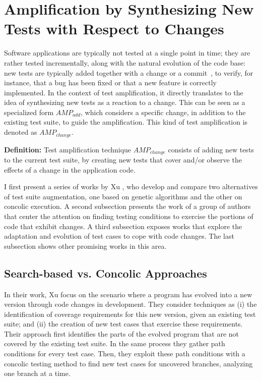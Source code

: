 \section{Amplification by Synthesizing New Tests with Respect to Changes}
\label{sec:sota:category-2}

Software applications are typically not tested at a single point in time; they are rather tested incrementally, along with the natural evolution of the code base: 
new tests are typically added together with a change or a commit~\cite{azaidmanEMSE2011,DBLP:conf/icst/ZaidmanRDD08}, to verify, for instance, that a bug has been fixed or that a new feature is correctly implemented. 
In the context of test amplification, it directly translates to the idea of synthesizing new tests as a reaction to a change. 
This can be seen as a specialized form $AMP_{add}$, which considers a specific change, in addition to the existing test suite, to guide the amplification.
This kind of test amplification is denoted as $AMP_{change}$. 

\medskip
\begin{mdframed}
\textbf{Definition:} Test amplification technique $AMP_{change}$ consists of adding new tests to the current test suite, by creating new tests that cover and/or observe the effects of a change in the application code.
\end{mdframed}

I first present a series of works by Xu \etal, who develop and compare two alternatives of test suite augmentation, one based on genetic algorithms and the other on concolic execution. 
A second subsection presents the work of a group of authors that center the attention on finding testing conditions to exercise the portions of code that exhibit changes. 
A third subsection exposes works that explore the adaptation and evolution of test cases to cope with code changes. 
The last subsection shows other promising works in this area.

\subsection{Search-based vs. Concolic Approaches}
\label{subsec:sota:category-2:search-based-vs-concolic}

In their work, Xu \etal\cite{xu2009directed} focus on the scenario where a program has evolved into a new version through code changes in development. 
They consider techniques as 
(i) the identification of coverage requirements for this new version, given an existing test suite;
and (ii) the creation of new test cases that exercise these requirements. 
Their approach first identifies the parts of the evolved program that are not covered by the existing test suite. 
In the same process they gather path conditions for every test case. 
Then, they exploit these path conditions with a concolic testing method to find new test cases for uncovered branches, analyzing one branch at a time.

